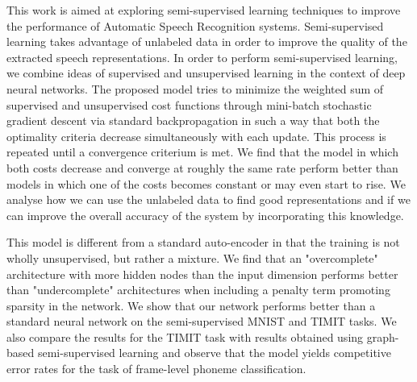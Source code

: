 This work is aimed at exploring semi-supervised learning techniques to improve the performance of Automatic Speech Recognition systems. Semi-supervised learning takes advantage of unlabeled data in order to improve the quality of the extracted speech representations.
In order to perform semi-supervised learning, we combine ideas of supervised and unsupervised learning in the context of deep neural networks.
The proposed model tries to minimize the weighted sum of supervised and unsupervised cost functions through mini-batch stochastic gradient descent via standard backpropagation in such a way that both the optimality criteria decrease simultaneously with each update. This process is repeated until a convergence criterium is met. We find that the model in which both costs decrease and converge at roughly the same rate perform better than models in which one of the costs becomes constant or may even start to rise.
We analyse how we can use the unlabeled data to find good representations and if we can improve the overall accuracy of the system by incorporating this knowledge.

This model is different from a standard auto-encoder in that the training is not wholly unsupervised, but rather a mixture. We find that an "overcomplete" architecture with more hidden nodes than the input dimension performs better than "undercomplete" architectures when including a penalty term promoting sparsity in the network.
We show that our network performs better than a standard neural network on the semi-supervised MNIST and TIMIT tasks. We also compare the results for the TIMIT task with results obtained using graph-based semi-supervised learning and observe that the model yields competitive error rates for the task of frame-level phoneme classification.
\endinput

